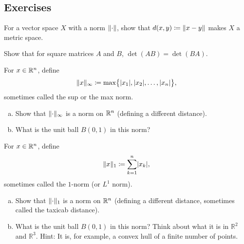 \subsection{Exercises}

\begin{exercise}
For a vector space $X$ with a norm $\lVert {\cdot} \rVert$, show that
$d(x,y) \coloneqq \lVert {x-y} \rVert$ makes $X$ a metric space.
\end{exercise}

\begin{exercise}[Easy]
Show that for square matrices $A$ and $B$, $\det(AB) = \det(BA)$.
\end{exercise}

\begin{exercise}
For $x \in {\mathbb{R}}^n$, define
\begin{equation*}
\lVert {x} \rVert_{\infty} \coloneqq
\max \bigl\{ \lvert {x_1} \rvert, \lvert {x_2} \rvert, \ldots, \lvert {x_n} \rvert \bigr\} ,
\end{equation*}
sometimes called the sup or the max norm.
\begin{enumerate}[a)]
\item
Show that $\lVert {\cdot} \rVert_\infty$ is a norm on ${\mathbb{R}}^n$ (defining a different
distance).
\item
What is the unit ball $B(0,1)$ in this norm?
\end{enumerate}
\end{exercise}

\begin{exercise}
For $x \in {\mathbb{R}}^n$, define
\begin{equation*}
\lVert {x} \rVert_{1} \coloneqq \sum_{k=1}^n \lvert {x_k} \rvert,
\end{equation*}
sometimes called the $1$-norm (or $L^1$ norm).
\begin{enumerate}[a)]
\item
Show that $\lVert {\cdot} \rVert_1$ is a norm on ${\mathbb{R}}^n$ (defining a different
distance, sometimes called the taxicab distance).
\item
What is the unit ball $B(0,1)$ in this norm?
Think about what it is in ${\mathbb{R}}^2$ and $\mathbb{R}^3$.
Hint: It is, for example, a convex hull of a finite number of points.
\end{enumerate}
\end{exercise}

